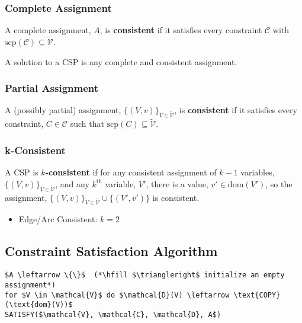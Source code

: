 \subsubsection{Complete Assignment}
\begin{definition}
    A complete assignment, \(A\), is \textbf{consistent} if it satisfies every constraint \(\mathcal{C}\) with \(\text{scp}(\mathcal{C}) \subseteq \tilde{\mathcal{V}}\).
\end{definition}

\begin{warning}
    A solution to a CSP is any complete and consistent assignment.
\end{warning}

\subsubsection{Partial Assignment}
\begin{definition}
    A (possibly partial) assignment, \(\{(V, v)\}_{V \in \tilde{\mathcal{V}}}\), is \textbf{consistent} if it satisfies every constraint, \(C \in \mathcal{C}\) such that \(\text{scp}(C) \subseteq \tilde{\mathcal{V}}\).
\end{definition}

\subsubsection{k-Consistent}
\begin{definition}
    A CSP is \textbf{\(k\)-consistent} if for any consistent assignment of \(k - 1\) variables, \(\{(V, v)\}_{V \in \tilde{\mathcal{V}}}\), and any \(k^\text{th}\) variable, \(V'\), there is a value, \(v' \in \text{dom}(V')\), so the assignment, \(\{(V, v)\}_{V \in \tilde{\mathcal{V}}} \cup \{(V', v')\}\) is consistent.
\end{definition}

\begin{notes}
    \begin{itemize}
        \item Edge/Arc Consistent: \(k = 2\)
    \end{itemize}
\end{notes}
\newpage

\subsection{Constraint Satisfaction Algorithm}
\begin{algo}
\begin{lstlisting}
$A \leftarrow \{\}$  (*\hfill $\triangleright$ initialize an empty assignment*)
for $V \in \mathcal{V}$ do $\mathcal{D}(V) \leftarrow \text{COPY}(\text{dom}(V))$
SATISFY($\mathcal{V}, \mathcal{C}, \mathcal{D}, A$)
\end{lstlisting}
\end{algo}

